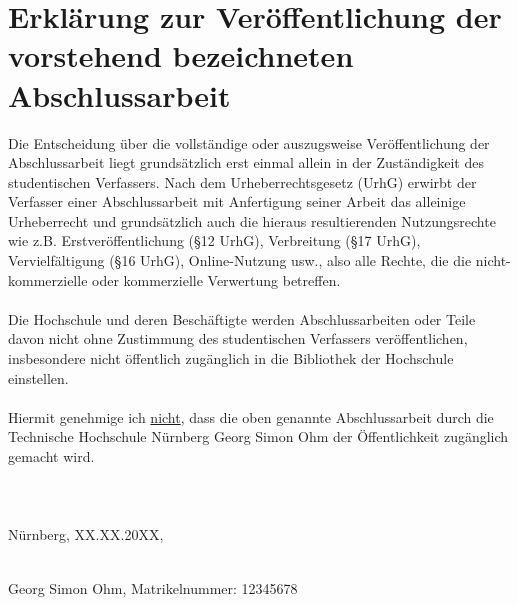 \documentclass[captions=tableheading, listof=leveldown, 11pt]{scrartcl}
\newcommand{\autor}{Georg Simon Ohm}
\newcommand{\matrikelnr}{12345678}
\newcommand{\abgabe}{XX.XX.20XX}          %
\begin{document}
\section*{Erklärung zur Veröffentlichung der vorstehend bezeichneten Abschlussarbeit} 
Die Entscheidung über die vollständige oder auszugsweise Veröffentlichung der Abschlussarbeit liegt grundsätzlich erst einmal allein in der Zuständigkeit des studentischen Verfassers. Nach dem Urheberrechtsgesetz (UrhG) erwirbt der Verfasser einer Abschlussarbeit mit Anfertigung seiner Arbeit das alleinige Urheberrecht und grundsätzlich auch die hieraus resultierenden Nutzungsrechte wie z.B. Erstveröffentlichung (\S 12 UrhG), Verbreitung (\S 17 UrhG), Vervielfältigung (\S 16 UrhG), Online-Nutzung usw., also alle Rechte, die die nicht-kommerzielle oder kommerzielle Verwertung betreffen.\\\\
Die Hochschule und deren Beschäftigte werden Abschlussarbeiten oder Teile davon nicht ohne Zustimmung des studentischen Verfassers veröffentlichen, insbesondere nicht öffentlich zugänglich in die Bibliothek der Hochschule einstellen.\\\\
Hiermit genehmige ich \underline{nicht}, dass die oben genannte Abschlussarbeit durch die Technische Hochschule Nürnberg Georg Simon Ohm der Öffentlichkeit zugänglich gemacht wird.\\\\\\\\ %
\hspace{50mm}
\vspace{15mm}
\noindent{}Nürnberg, \abgabe,
\begin{minipage}[t]{8cm}
\centering \dotfill \\
\autor, Matrikelnummer: \matrikelnr
\end{minipage}
%
\newpage
{}
\setcounter{page}{5} %
\end{document}
